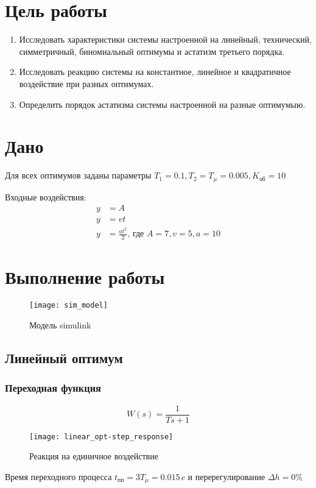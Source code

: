 


	
	\section{Цель работы}
		\begin{enumerate}
			\item Исследовать характеристики системы настроенной на линейный, технический, симметричный, биномиальный оптимумы и астатизм третьего порядка.
			\item Исследовать реакцию системы на константное, линейное и квадратичное воздействие при разных оптимумах.
            \item Определить порядок астатизма системы настроенной на разные оптимумыю.
		\end{enumerate}
	\section{Дано}
		Для всех оптимумов заданы параметры $T_1=0.1, T_2=T_{\mu}=0.005, K_{\text{об}}=10$

		Входные воздействия:
		\begin{align*}
			  y &= A\\
			  y &= vt\\
			  y &= \frac{at^2}{2}\mbox{, где } A = 7, v=5, a=10
		\end{align*}
	\section{Выполнение работы}
		\begin{figure}[H]
			\centering
			\texttt{[image: sim\_model]}
			\caption{Модель simulink}
		\end{figure}
		\newpage
		\subsection{Линейный оптимум}
			\subsubsection{Переходная функция}
				$$W(s)=\frac{1}{Ts+1}$$
				\begin{figure}[H]
					\centering
					\texttt{[image: linear\_opt-step\_response]}
					\caption{Реакция на единичное воздействие}
				\end{figure}
				Время переходного процесса $t_{\text{пп}}=3T_{\mu}=0.015\,c$ и перерегулирование $\Delta h=0\%$
